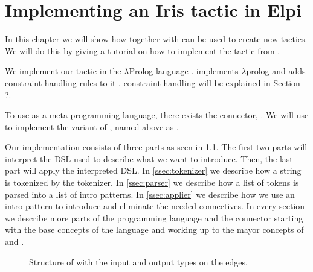 \documentclass[thesis.tex]{subfiles}
\begin{document}
\chapter{Implementing an Iris tactic in Elpi}
In this chapter we will show how \elpi together with \ce can be used to create new tactics. We will do this by giving a tutorial on how to implement the  tactic from \iris.

We implement our tactic in the $\lambda$Prolog language \elpi \cite{dunchevELPIFastEmbeddable2015,guidiImplementingTypeTheory2019}. \elpi implements $\lambda$prolog \cite{millerHigherorderLogicProgramming1986,millerUniformProofsFoundation1991,belleanneePragmaticReconstructionLProlog1999,millerProgrammingHigherOrderLogic2012} and adds constraint handling rules to it \cite{monfroyConstraintHandlingRules2011}. constraint handling will be explained in Section ?.

To use \elpi as a \coq meta programming language, there exists the \elpi \coq connector, \ce \cite{tassiElpiExtensionLanguage2018}. We will use \ce to implement the \elpi variant of , named above as .

Our \elpi implementation  consists of three parts as seen in \cref{fig:eiintrosstruct}. The first two parts will interpret the DSL used to describe what we want to introduce. Then, the last part will apply the interpreted DSL. In \cref{ssec:tokenizer} we describe how a string is tokenized by the tokenizer. In \cref{ssec:parser} we describe how a list of tokens is parsed into a list of intro patterns. In \cref{ssec:applier} we describe how we use an intro pattern to introduce and eliminate the needed connectives. In every section we describe more parts of the \elpi programming language and the \ce connector starting with the base concepts of the language and working up to the mayor concepts of \elpi and \ce.
\begin{figure}
  \centering
  \caption{Structure of  with the input and output types on the edges.}
  \label{fig:eiintrosstruct}
\end{figure}
\end{document}
